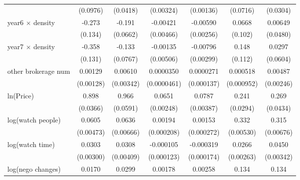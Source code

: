 {\begin{tabular}{l*{6}{c}}
            &    (0.0976)         &    (0.0418)         &   (0.00324)         &   (0.00136)         &    (0.0716)         &    (0.0304)         \\
\addlinespace
year6 $\times$ density&      -0.273\sym{**} &      -0.191\sym{***}&    -0.00421         &    -0.00590\sym{**} &      0.0668         &     0.00649         \\
            &     (0.134)         &    (0.0662)         &   (0.00466)         &   (0.00256)         &     (0.102)         &    (0.0480)         \\
\addlinespace
year7 $\times$ density&      -0.358\sym{***}&      -0.133\sym{*}  &    -0.00135         &    -0.00796\sym{***}&       0.148         &      0.0297         \\
            &     (0.131)         &    (0.0767)         &   (0.00506)         &   (0.00299)         &     (0.112)         &    (0.0604)         \\
\addlinespace
other brokerage num  &     0.00129         &     0.00610\sym{*}  &   0.0000350         &   0.0000271         &    0.000518         &     0.00487\sym{**} \\
            &   (0.00128)         &   (0.00342)         & (0.0000461)         &  (0.000137)         &  (0.000952)         &   (0.00246)         \\
\addlinespace
ln(Price)&       0.898\sym{***}&       0.966\sym{***}&      0.0651\sym{***}&      0.0787\sym{***}&       0.241\sym{***}&       0.269\sym{***}\\
            &    (0.0366)         &    (0.0591)         &   (0.00248)         &   (0.00387)         &    (0.0294)         &    (0.0434)         \\
\addlinespace
log(watch people)&      0.0605\sym{***}&      0.0636\sym{***}&     0.00194\sym{***}&     0.00153\sym{***}&       0.332\sym{***}&       0.315\sym{***}\\
            &   (0.00473)         &   (0.00666)         &  (0.000208)         &  (0.000272)         &   (0.00530)         &   (0.00676)         \\
\addlinespace
log(watch time)&      0.0303\sym{***}&      0.0308\sym{***}&   -0.000105         &   -0.000319\sym{*}  &      0.0266\sym{***}&      0.0450\sym{***}\\
            &   (0.00300)         &   (0.00409)         &  (0.000123)         &  (0.000174)         &   (0.00263)         &   (0.00342)         \\
\addlinespace
log(nego changes)&      0.0170\sym{**} &      0.0299\sym{**} &     0.00178\sym{***}&     0.00258\sym{***}&       0.134\sym{***}&       0.134\sym{***}\\

\end{tabular}}
